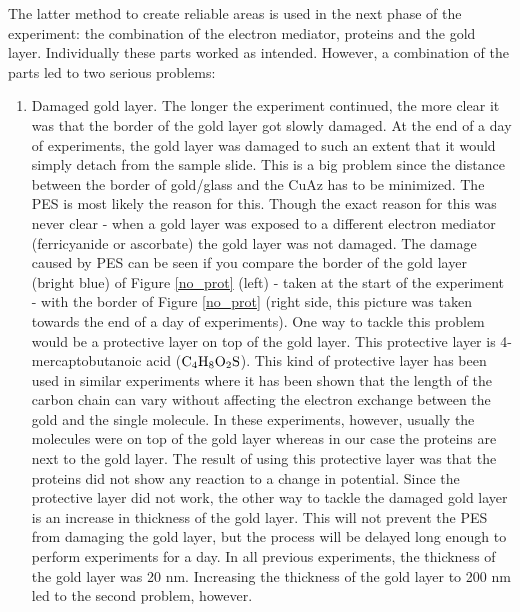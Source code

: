 \documentclass[twoside,single]{lion-msc}
\begin{document}
The latter method to create reliable areas is used in the next phase of the experiment: the combination of the electron mediator, proteins and the gold layer. Individually these parts worked as intended. However, a combination of the parts led to two serious problems:
\begin{enumerate}


\item Damaged gold layer.
The longer the experiment continued, the more clear it was that the border of the gold layer got slowly damaged. At the end of a day of experiments, the gold layer was damaged to such an extent that it would simply detach from the sample slide. This is a big problem since the distance between the border of gold/glass and the CuAz has to be minimized. The PES is most likely the reason for this. Though the exact reason for this was never clear - when a gold layer was exposed to a different electron mediator (ferricyanide or ascorbate) the gold layer was not damaged. The damage caused by PES can be seen if you compare the border of the gold layer (bright blue) of Figure \ref{no_prot} (left) - taken at the start of the experiment -  with the border of Figure \ref{no_prot} (right side, this picture was taken towards the end of a day of experiments). One way to tackle this problem would be a protective layer on top of the gold layer. This protective layer is 4-mercaptobutanoic acid ($\textup{C}_{4}\textup{H}_{8}\textup{O}_{2}\textup{S}$). This kind of protective layer has been used in similar experiments \cite{Elmalk2012} where it has been shown that the length of the carbon chain can vary without affecting the electron exchange between the gold and the single molecule. In these experiments, however, usually the molecules were on top of the gold layer whereas in our case the proteins are next to the gold layer. The result of using this protective layer was that the proteins did not show any reaction to a change in potential. Since the protective layer did not work, the other way to tackle the damaged gold layer is an increase in thickness of the gold layer. This will not prevent the PES from damaging the gold layer, but the process will be delayed long enough to perform experiments for a day. In all previous experiments, the thickness of the gold layer was 20 nm. Increasing the thickness of the gold layer to 200 nm led to the second problem, however.



\end{enumerate}
\end{document}

